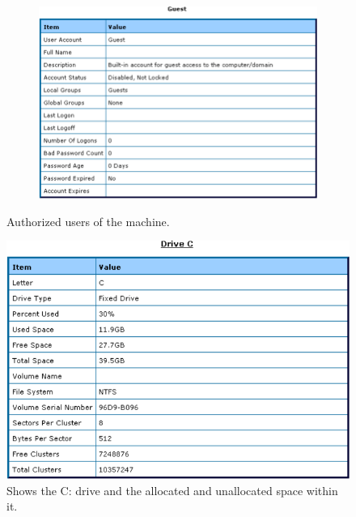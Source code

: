 \begin{figure}[H]
\begin{subfigure}[b]{0.49\textwidth}
        \includegraphics[width=\textwidth]{figures/pic14.png}
    \end{subfigure}
    \caption{Authorized users of the machine.}
\end{figure}

\begin{figure}[H]
    \centering
    \includegraphics[width=0.8\linewidth]{figures/pic15.png}
    \caption{Shows the C: drive and the allocated and unallocated space within it.}
\end{figure}


